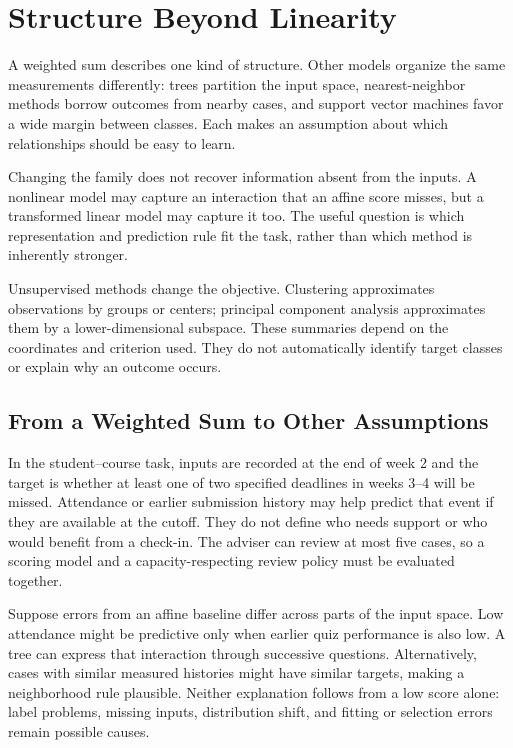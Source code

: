 \begingroup
\raggedbottom
{}
\chapter{Structure Beyond Linearity}
\label{ch:structure-beyond-linearity}

A weighted sum describes one kind of structure. Other models organize the same measurements differently: trees partition the input space, nearest-neighbor methods borrow outcomes from nearby cases, and support vector machines favor a wide margin between classes. Each makes an assumption about which relationships should be easy to learn.

Changing the family does not recover information absent from the inputs. A nonlinear model may capture an interaction that an affine score misses, but a transformed linear model may capture it too. The useful question is which representation and prediction rule fit the task, rather than which method is inherently stronger.

Unsupervised methods change the objective. Clustering approximates observations by groups or centers; principal component analysis approximates them by a lower-dimensional subspace. These summaries depend on the coordinates and criterion used. They do not automatically identify target classes or explain why an outcome occurs.

\section{From a Weighted Sum to Other Assumptions}

In the student--course task, inputs are recorded at the end of week 2 and the target is whether at least one of two specified deadlines in weeks 3--4 will be missed. Attendance or earlier submission history may help predict that event if they are available at the cutoff. They do not define who needs support or who would benefit from a check-in. The adviser can review at most five cases, so a scoring model and a capacity-respecting review policy must be evaluated together.

Suppose errors from an affine baseline differ across parts of the input space. Low attendance might be predictive only when earlier quiz performance is also low. A tree can express that interaction through successive questions. Alternatively, cases with similar measured histories might have similar targets, making a neighborhood rule plausible. Neither explanation follows from a low score alone: label problems, missing inputs, distribution shift, and fitting or selection errors remain possible causes.

